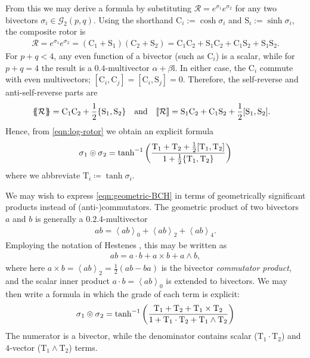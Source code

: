 \documentclass[12pt,a4paper]{article}
\makeatletter
\newcommand\x[1]{\@nameuse{\detokenize{#1}}}
\newcommand{\GA}[1][]{\mathcal{G}_{#1}}
\newcommand{\rotor}[1]{\mathcal{#1}}
\newcommand{\vol}{\mathbb{i}}
\newcommand{\grade}[2][]{\left\langle#2\right\rangle_{#1}}
\newcommand{\srev}[1]{\qty{\!\!\qty{#1}\!\!}}
\newcommand{\arev}[1]{\qty[\!\qty[#1]\!]}
\newcommand{\Co}{\mathrm{C}_}
\newcommand{\Si}{\mathrm{S}_}
\newcommand{\Ta}{\mathrm{T}_}
\newcommand{\bch}[2]{#1 \circledcirc #2}
\makeatother
\begin{document}
From this we may derive a \x{BCH} formula by substituting $\rotor R = e^{\sigma{}_1}e^{\sigma{}_2}$ for any two bivectors $\sigma{}_i \in \GA[2](p, q)$.
Using the shorthand $\Co{i} :={} \cosh \sigma{}_i$ and $\Si{i} :={} \sinh \sigma{}_i$, the composite rotor is
\begin{align}
	\rotor R = e^{\sigma{}_1}e^{\sigma{}_2}
	= (\Co1 + \Si1)(\Co2 + \Si2)
	= \Co1\Co2 + \Si1\Co2 + \Co1\Si2 + \Si1\Si2
.\end{align}
For $p + q < 4$, any even function of a bivector (such as $\Co{i}$) is a scalar, while for $p + q = 4$ the result is a $\qty{0,4}$-multivector $\alpha{} + \beta{}\vol$.
In either case, the $\Co{i}$ commute with even multivectors; $[\Co{i}, \Co{j}] = [\Co{i}, \Si{j}] = 0$.
Therefore, the self-reverse and anti-self-reverse parts are
\begin{align}
	\srev{\rotor R} &= \Co1\Co2 + \frac12\qty{\Si1, \Si2}
&	&\text{and}
&	\arev{\rotor R} &= \Si1\Co2 + \Co1\Si2 + \frac12\qty[\Si1, \Si2]
	\label{eqn:arev-and-srev-parts}
.\end{align}
Hence, from \eqref{eqn:log-rotor} we obtain an explicit \x{BCH} formula
\begin{align}
	\bch{\sigma{}_1}{\sigma{}_2}
	= \tanh^{-1}\qty(\frac{
		\Ta1 + \Ta2 + \frac12\qty[\Ta1, \Ta2]
	}{
		1 + \frac12\qty{\Ta1, \Ta2}
	})
	\label{eqn:geometric-BCH}
\end{align}
where we abbreviate $\Ta{i} \coloneqq \tanh \sigma{}_i$.

We may wish to express \eqref{eqn:geometric-BCH} in terms of geometrically significant products instead of \mbox{(anti-)}commutators.
The geometric product of two bivectors $a$ and $b$ is generally a $\qty{0,2,4}$-multivector
\begin{align}
	ab = \grade[0]{ab} + \grade[2]{ab} + \grade[4]{ab}
.\end{align}
Employing the notation of Hestenes \cite{doran2003ga}, this may be written as
\begin{align}
	ab = a\cdot{}b + a\times{}b + a\wedge b
	\label{eqn:bivector-products}
,\end{align}
where here $a\times{}b = \grade[2]{ab} = \frac12(ab - ba)$ is the bivector \emph{commutator product}, and the scalar inner product $a\cdot{}b = \grade[0]{ab}$ is extended to bivectors.
We may then write a \x{BCH} formula in which the grade of each term is explicit:
\begin{align}
	\bch{\sigma{}_1}{\sigma{}_2} = \tanh^{-1}\qty(\frac{
		\Ta1 + \Ta2 + \Ta1 \times{} \Ta2
	}{
		1 + \Ta1 \cdot{} \Ta2 + \Ta1 \wedge{} \Ta2 
	})
	\label{eqn:geometric-BCH-products}
\end{align}
The numerator is a bivector, while the denominator contains scalar ($\Ta1\cdot{}\Ta2$) and $4$-vector ($\Ta1\wedge\Ta2$) terms.
\end{document}
